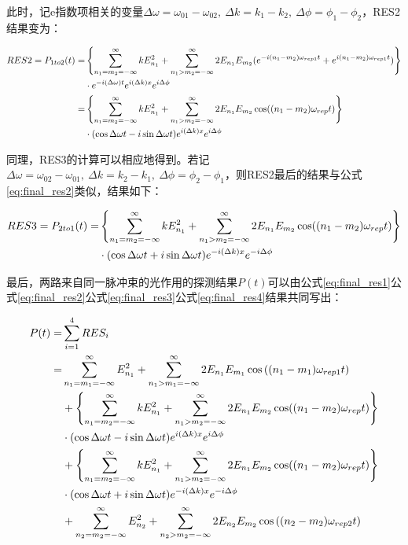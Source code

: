 此时，记e指数项相关的变量$\Delta\omega=\omega_{01}-\omega_{02},\ \Delta k=k_1-k_2,\ \Delta\phi=\phi_1-\phi_2$，RES2结果变为：
\begin{footnotesize}
\begin{align}
    RES2=P_{1to2}(t)=&\left\{\sum_{n_1=m_2=-\infty}^{\infty}kE_{n_1}^2+\sum_{n_1>m_2=-\infty}^{\infty}2E_{n_1}E_{m_2}(e^{-i(n_1-m_2)\omega_{rep1}t}+e^{i(n_1-m_2)\omega_{rep1}t})\right\}\\
    & \cdot e^{-i(\Delta\omega)t}e^{i(\Delta k)x}e^{i\Delta\phi}\\
    =&\left\{\sum_{n_1=m_2=-\infty}^{\infty}kE_{n_1}^2+\sum_{n_1>m_2=-\infty}^{\infty}2E_{n_1}E_{m_2}\cos((n_1-m_2)\omega_{rep}t)\right\}\notag\\
    & \cdot (\cos\Delta\omega t-i\sin\Delta\omega t)e^{i(\Delta k)x}e^{i\Delta\phi}\label{eq:final_res2}
\end{align}
\end{footnotesize}

同理，RES3的计算可以相应地得到。若记$\Delta\omega=\omega_{02}-\omega_{01},\ \Delta k=k_2-k_1,\ \Delta\phi=\phi_2-\phi_1$，则RES2最后的结果与公式\eqref{eq:final_res2}类似，结果如下：
\begin{small}
\begin{align}
    RES3=P_{2to1}(t)=&\left\{\sum_{n_1=m_2=-\infty}^{\infty}kE_{n_1}^2+\sum_{n_1>m_2=-\infty}^{\infty}2E_{n_1}E_{m_2}\cos((n_1-m_2)\omega_{rep}t)\right\}\notag\\
    & \cdot (\cos\Delta\omega t+i\sin\Delta\omega t)e^{-i(\Delta k)x}e^{-i\Delta\phi}\label{eq:final_res3}
\end{align}    
\end{small}

最后，两路来自同一脉冲束的光作用的探测结果$P(t)$可以由公式\eqref{eq:final_res1}公式\eqref{eq:final_res2}公式\eqref{eq:final_res3}公式\eqref{eq:final_res4}结果共同写出：
\begin{small}
\begin{align}
    P(t)=&\sum_{i=1}^{4}RES_i\\
    =&\sum_{n_1=m_1=-\infty}^{\infty}E_{n_1}^2 + \sum_{n_1>m_1=-\infty}^{\infty}2E_{n_1} E_{m_1} \cos\left((n_1-m_1)\omega_{rep1}t\right)\\
    &+\left\{\sum_{n_1=m_2=-\infty}^{\infty}kE_{n_1}^2+\sum_{n_1>m_2=-\infty}^{\infty}2E_{n_1}E_{m_2}\cos((n_1-m_2)\omega_{rep}t)\right\}\notag\\
    & \cdot (\cos\Delta\omega t-i\sin\Delta\omega t)e^{i(\Delta k)x}e^{i\Delta\phi}\\
    &+\left\{\sum_{n_1=m_2=-\infty}^{\infty}kE_{n_1}^2+\sum_{n_1>m_2=-\infty}^{\infty}2E_{n_1}E_{m_2}\cos((n_1-m_2)\omega_{rep}t)\right\}\notag\\
    & \cdot (\cos\Delta\omega t+i\sin\Delta\omega t)e^{-i(\Delta k)x}e^{-i\Delta\phi}\\
    &+\sum_{n_2=m_2=-\infty}^{\infty}E_{n_2}^2 + \sum_{n_2>m_2=-\infty}^{\infty}2E_{n_2} E_{m_2} \cos\left((n_2-m_2)\omega_{rep2}t\right)
\end{align}
\end{small}

